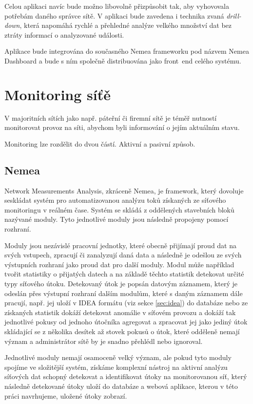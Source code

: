 Celou aplikaci navíc bude možno libovolně přizpůsobit tak, aby vyhovovala potřebám daného správce sítě. V aplikaci bude zavedena i technika zvaná {\it drill-down}, která napomáhá rychlé a přehledné analýze velkého množství dat bez ztráty informací o analyzované události.

Aplikace bude integrována do současného Nemea frameworku pod názvem Nemea Dashboard a bude s ním společně distribuována jako front~end celého systému.

\chapter{Monitoring síťě}

V majoritních sítích jako např. páteřní či firemní sítě je téměř nutností monitorovat provoz na síti, abychom byli informování o jejím aktuálním stavu.

Monitoring lze rozdělit do dvou částí. Aktivní a pasivní způsob.

\section{Nemea}

Network Measurements Analysis, zkráceně Nemea, je framework, který dovoluje seskládat systém pro automatizovanou analýzu toků získaných ze síťového monitoringu v reálném čase. Systém se skládá z oddělených stavebních bloků nazývané moduly. Tyto jednotlivé moduly jsou následně propojeny pomocí rozhraní.

Moduly jsou nezávislé pracovní jednotky, které obecně přijímají proud dat na svých vstupech, zpracují či zanalyzují daná data a následně je odešlou ze svých výstupních rozhraní jako proud dat pro další moduly. Modul může například tvořit statistiky o přijatých datech a na základě těchto statistik detekovat určité typy síťového útoku. Detekovaný útok je popsán datovým záznamem, který je odeslán přes výstupní rozhraní dalším modulům, které s daným záznamem dále pracují, např. jej uloží v IDEA formátu (viz sekce \ref{sec:idea}) do databáze nebo ze získaných statistik dokáží detekovat anomálie v síťovém provozu a dokáží tak jednotlivé pokusy od jednoho útočníka agregovat a zpracovat jej jako jediný útok skládající se z několika desítek až stovek pokusů o útok, které odděleně nemají význam a administrátor sítě by je snadno přehlédl nebo ignoroval.

Jednotlivé moduly nemají osamoceně velký význam, ale pokud tyto moduly spojíme ve složitější systém, získáme komplexní nástroj na aktivní analýzu síťových dat schopný detekovat a identifikovat útoky na monitorovanou síť, který následně detekované útoky uloží do databáze a webová aplikace, kterou v této práci navrhujeme, uložené útoky zobrazí.

